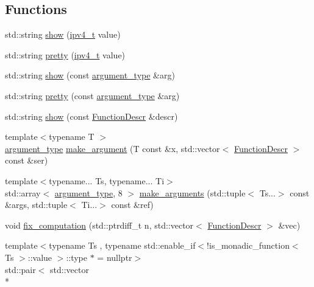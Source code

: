 \subsection*{Functions}
\begin{DoxyCompactItemize}
\item 
std\+::string \hyperlink{namespacepfq_1_1lang_a6b371b706602987f7e45c7558824fa34}{show} (\hyperlink{structpfq_1_1lang_1_1ipv4__t}{ipv4\+\_\+t} value)
\item 
std\+::string \hyperlink{namespacepfq_1_1lang_a7a4c9ec62feae5479366427beeff5b74}{pretty} (\hyperlink{structpfq_1_1lang_1_1ipv4__t}{ipv4\+\_\+t} value)
\item 
std\+::string \hyperlink{namespacepfq_1_1lang_a1e54c94175cad1980fc43030d265b58a}{show} (const \hyperlink{structpfq_1_1lang_1_1argument__type}{argument\+\_\+type} \&arg)
\item 
std\+::string \hyperlink{namespacepfq_1_1lang_a2dc4c3535607e668e86aa96674c41eb0}{pretty} (const \hyperlink{structpfq_1_1lang_1_1argument__type}{argument\+\_\+type} \&arg)
\item 
std\+::string \hyperlink{namespacepfq_1_1lang_a7e9458d3c3b90f405ee6df6cbfc43c58}{show} (const \hyperlink{structpfq_1_1lang_1_1FunctionDescr}{Function\+Descr} \&descr)
\item 
{\footnotesize template$<$typename T $>$ }\\\hyperlink{structpfq_1_1lang_1_1argument__type}{argument\+\_\+type} \hyperlink{namespacepfq_1_1lang_ac28f404ec59b7aea311721e0f26b5577}{make\+\_\+argument} (T const \&x, std\+::vector$<$ \hyperlink{structpfq_1_1lang_1_1FunctionDescr}{Function\+Descr} $>$ const \&ser)
\item 
{\footnotesize template$<$typename... Ts, typename... Ti$>$ }\\std\+::array$<$ \hyperlink{structpfq_1_1lang_1_1argument__type}{argument\+\_\+type}, 8 $>$ \hyperlink{namespacepfq_1_1lang_a4a28968aa686d5b657ea532a0f8a408e}{make\+\_\+arguments} (std\+::tuple$<$ Ts...$>$ const \&args, std\+::tuple$<$ Ti...$>$ const \&ref)
\item 
void \hyperlink{namespacepfq_1_1lang_adffac06fa2bba45eca6f8eeab33262d2}{fix\+\_\+computation} (std\+::ptrdiff\+\_\+t n, std\+::vector$<$ \hyperlink{structpfq_1_1lang_1_1FunctionDescr}{Function\+Descr} $>$ \&vec)
\item 
{\footnotesize template$<$typename Ts , typename std\+::enable\+\_\+if$<$!is\+\_\+monadic\+\_\+function$<$ Ts $>$\+::value $>$\+::type $\ast$  = nullptr$>$ }\\std\+::pair$<$ std\+::vector\\*

\end{DoxyCompactItemize}
